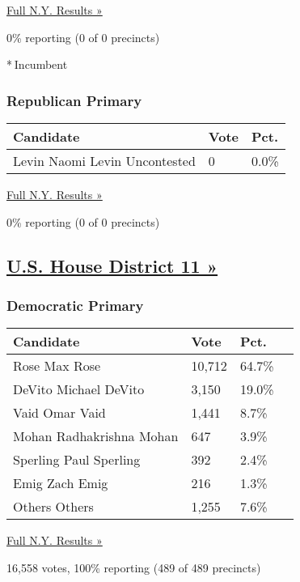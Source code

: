 \href{https://www.nytimes3xbfgragh.onion/elections/results/new-york}{Full
N.Y. Results »}

0\% reporting (0 of 0 precincts)

* Incumbent

\hypertarget{republican-primary-6}{%
\subsubsection{Republican Primary}\label{republican-primary-6}}

\begin{longtable}[]{@{}lll@{}}
\toprule
Candidate & Vote & Pct.\tabularnewline
\midrule
\endhead
 Levin Naomi Levin Uncontested & 0 & 0.0\%\tabularnewline
\bottomrule
\end{longtable}

\href{https://www.nytimes3xbfgragh.onion/elections/results/new-york}{Full
N.Y. Results »}

0\% reporting (0 of 0 precincts)

\hypertarget{us-house-district-11-}{%
\subsection{\texorpdfstring{\href{https://www.nytimes3xbfgragh.onion/elections/results/new-york-house-district-11-primary-election}{U.S.
House District 11
»}}{U.S. House District 11 »}}\label{us-house-district-11-}}

\hypertarget{democratic-primary-11}{%
\subsubsection{Democratic Primary}\label{democratic-primary-11}}

\begin{longtable}[]{@{}llll@{}}
\toprule
Candidate & Vote & Pct. &\tabularnewline
\midrule
\endhead
 Rose Max Rose & 10,712 & 64.7\% &\tabularnewline
 DeVito Michael DeVito & 3,150 & 19.0\% &\tabularnewline
 Vaid Omar Vaid & 1,441 & 8.7\% &\tabularnewline
 Mohan Radhakrishna Mohan & 647 & 3.9\% &\tabularnewline
 Sperling Paul Sperling & 392 & 2.4\% &\tabularnewline
 Emig Zach Emig & 216 & 1.3\% &\tabularnewline
 Others Others & 1,255 & 7.6\% &\tabularnewline
\bottomrule
\end{longtable}

\href{https://www.nytimes3xbfgragh.onion/elections/results/new-york}{Full
N.Y. Results »}

16,558 votes, 100\% reporting (489 of 489 precincts)

